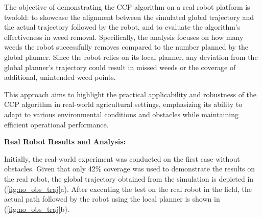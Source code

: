 \vspace*{6mm}   


The objective of demonstrating the CCP algorithm on a real robot platform is twofold: to showcase the alignment between the simulated global trajectory and the actual trajectory followed by the robot, and to evaluate the algorithm's effectiveness in weed removal. Specifically, the analysis focuses on how many weeds the robot successfully removes compared to the number planned by the global planner. Since the robot relies on its local planner, any deviation from the global planner's trajectory could result in missed weeds or the coverage of additional, unintended weed points.

\vspace*{6mm}   


This approach aims to highlight the practical applicability and robustness of the CCP algorithm in real-world agricultural settings, emphasizing its ability to adapt to various environmental conditions and obstacles while maintaining efficient operational performance.

\vspace*{6mm}   


\textbf{Real Robot Results and Analysis:}    

Initially, the real-world experiment was conducted on the first case without obstacles. Given that only 42\% coverage was used to demonstrate the results on the real robot, the global trajectory obtained from the simulation is depicted in (\autoref{fig:no_obs_traj}a). After executing the test on the real robot in the field, the actual path followed by the robot using the local planner is shown in (\autoref{fig:no_obs_traj}b).




